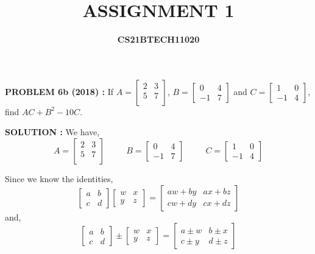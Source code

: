 \documentclass[journal,12pt,twocolumn]{IEEEtran}
\title{\textbf{ASSIGNMENT 1}}
\author{\textbf{CS21BTECH11020}}
\date{}
\begin{document}
  \maketitle
  \textbf{PROBLEM 6b (2018) :} 
      If $ A= \begin{bmatrix}
        2 & 3 \\
        5 & 7 \\
      \end{bmatrix}$,
      $ B= \begin{bmatrix}
        0 & 4 \\
        -1 & 7
      \end{bmatrix}$ and 
      $ C = \begin{bmatrix}
        1 & 0 \\
        -1 & 4
      \end{bmatrix}$, find $ AC+B^2-10C$.

  \bigskip
  \textbf{SOLUTION : }We have,
    $$ A= \begin{bmatrix}
      2 & 3 \\
      5 & 7 \\
    \end{bmatrix} \hspace{30pt}
     B= \begin{bmatrix}
      0 & 4 \\
      -1 & 7
    \end{bmatrix} \hspace{30pt}
     C = \begin{bmatrix}
      1 & 0 \\
      -1 & 4
    \end{bmatrix}$$
    
    Since we know the identities,
    \begin{equation}
       \begin{bmatrix}
        a & b \\
        c & d
      \end{bmatrix}
      \begin{bmatrix}
        w & x \\
        y & z
      \end{bmatrix}
      =
      \begin{bmatrix}
        aw+by & ax+bz \\
        cw+dy & cx+dz
      \end{bmatrix}
    \end{equation}
    and,
    \begin{equation}
      \begin{bmatrix}
        a & b \\
        c & d
      \end{bmatrix}
      \pm
      \begin{bmatrix}
        w & x \\
        y & z
      \end{bmatrix}
      =
      \begin{bmatrix}
        a\pm w & b\pm x \\
        c\pm y & d\pm z
      \end{bmatrix}
    \end{equation}
    
\end{document}
